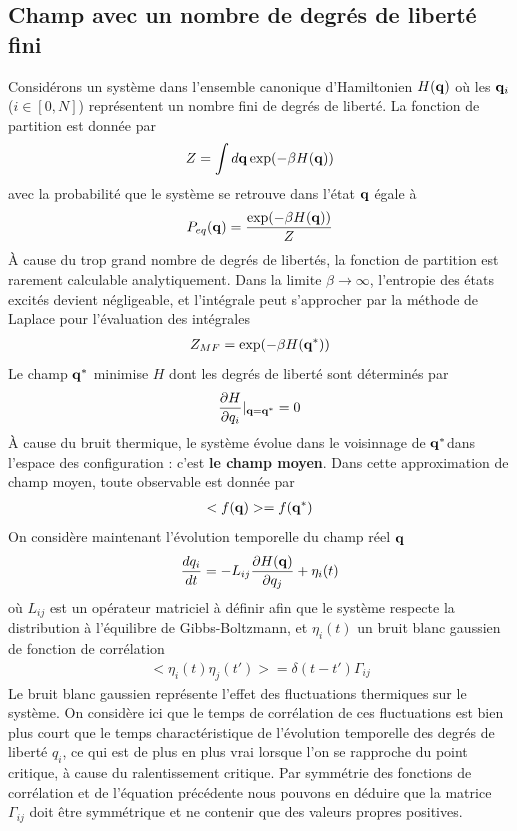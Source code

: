     \subsection{Champ avec un nombre de degrés de liberté fini}
Considérons un système dans l'ensemble canonique d'Hamiltonien  $H({\bf q})$ où les ${\bf q}_i$ ($i \in [0,N]$) représentent un nombre fini de degrés de liberté. La fonction de partition est donnée par 
\begin{align}
    Z = \int d{\bf q} \exp(-\beta H({\bf q}))
\end{align}
avec la probabilité que le système se retrouve dans l'état ${\bf q}$ égale à
\begin{align}
    P_{eq}({\bf q}) = \frac{\exp(-\beta H({\bf q}))}{Z}
    \label{eqdis}
\end{align}
À cause du trop grand nombre de degrés de libertés, la fonction de partition est rarement calculable analytiquement. Dans la limite $\beta \to \infty$, l'entropie des états excités devient négligeable, et l'intégrale peut s'approcher par la méthode de Laplace pour l'évaluation des intégrales 
\begin{align}
    Z_{MF}= \exp(-\beta H({\bf q}^*))
\end{align}
Le champ ${\bf q}^*$ minimise $H$ dont les degrés de liberté sont déterminés par
\begin{align}
    \frac{\partial H}{\partial q_i}|_{{\bf q}={\bf q^*}}=0
\end{align}
À cause du bruit thermique, le système évolue dans le voisinnage de ${\bf q}^*$dans l'espace des configuration : c'est \textbf{le champ moyen}. Dans cette approximation de champ moyen, toute observable est donnée par
\begin{align}
    < f({\bf q}) > = f({\bf q}^*)
\end{align}
On considère maintenant l'évolution temporelle du champ réel ${\bf q}$ 
\begin{align}
    \frac{d q_i}{dt} = -L_{ij}\frac{\partial H({\bf q})}{ \partial q_j} + \eta_i(t)
    \label{dynamique-langevin}
\end{align}
où $L_{ij}$ est un opérateur matriciel à définir afin que le système respecte la distribution à l'équilibre de Gibbs-Boltzmann,  et $\eta_i(t)$ un bruit blanc gaussien de fonction de corrélation
\begin{align}
   <  \eta_i(t)\eta_j(t') > =   \delta(t-t') \Gamma_{ij}
\end{align}
Le bruit blanc gaussien représente l'effet des fluctuations thermiques sur le système. On considère ici que le temps de corrélation de ces fluctuations est bien plus court que le temps charactéristique de l'évolution temporelle des degrés de liberté $q_i$, ce qui est de plus en plus vrai lorsque l'on se rapproche du point critique\cite{}, à cause du ralentissement critique. Par symmétrie des fonctions de corrélation et de l'équation précédente nous pouvons en déduire que la matrice $\Gamma_{ij}$ doit être symmétrique et ne contenir que des valeurs propres positives.
